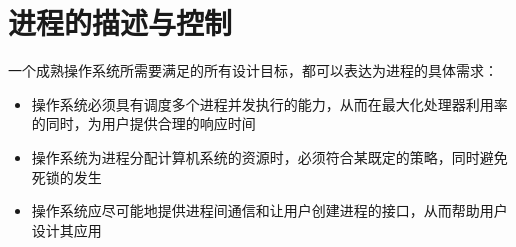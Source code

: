 
\chapter{进程的描述与控制}
{
    一个成熟操作系统所需要满足的所有设计目标，都可以表达为进程的具体需求：

    \begin{itemize}
        \item 操作系统必须具有调度多个进程并发执行的能力，从而在最大化处理器利用率的同时，为用户提供合理的响应时间
        \item 操作系统为进程分配计算机系统的资源时，必须符合某既定的策略，同时避免死锁的发生
        \item 操作系统应尽可能地提供进程间通信和让用户创建进程的接口，从而帮助用户设计其应用
    \end{itemize}

    
    
    
    
    
    
}

\cleardoublepage

\endinput
